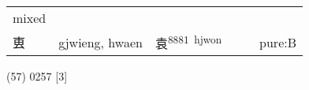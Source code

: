 \documentclass[14pt,a4paper]{scrartcl}
\begin{document}
\begin{longtable}[c]{@{}llllll@{}}
\begin{minipage}[t]{0.14\columnwidth}
mixed
\strut\end{minipage}\tabularnewline
\begin{minipage}[t]{0.14\columnwidth}\raggedright\strut
叀
\strut\end{minipage} &
\begin{minipage}[t]{0.14\columnwidth}\raggedright\strut
gjwieng, hwaen
\strut\end{minipage} &
\begin{minipage}[t]{0.14\columnwidth}\raggedright\strut
袁\textsuperscript{8881~hjwon}
\strut\end{minipage} &
\begin{minipage}[t]{0.14\columnwidth}\raggedright\strut
\strut\end{minipage} &
\begin{minipage}[t]{0.14\columnwidth}\raggedright\strut
\strut\end{minipage} &
\begin{minipage}[t]{0.14\columnwidth}\raggedright\strut
pure:B
\strut\end{minipage}\tabularnewline
\bottomrule
\end{longtable}

(57) 0257 {[}3{]}
\end{document}
